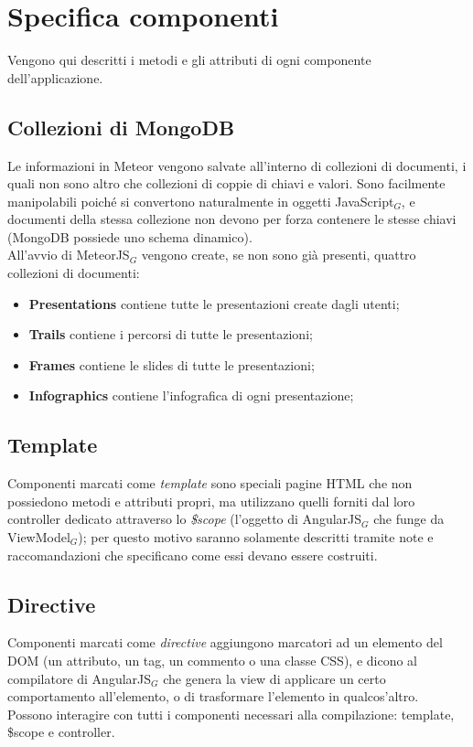 \clearpage
\section{Specifica componenti}
Vengono qui descritti i metodi e gli attributi di ogni componente dell'applicazione. \\
\subsection{Collezioni di MongoDB} \label{collezioni}
Le informazioni in Meteor vengono salvate all'interno di collezioni di documenti, i quali non sono altro che collezioni di coppie di chiavi e valori. Sono facilmente manipolabili poiché si convertono naturalmente in oggetti JavaScript$_G$, e documenti della stessa collezione non devono per forza contenere le stesse chiavi (MongoDB possiede uno schema dinamico). \\
All'avvio di MeteorJS$_G$ vengono create, se non sono già presenti, quattro collezioni di documenti:
\begin{itemize}
\item \textbf{Presentations} contiene tutte le presentazioni create dagli utenti;
\item \textbf{Trails} contiene i percorsi di tutte le presentazioni;
\item \textbf{Frames} contiene le slides di tutte le presentazioni;
\item \textbf{Infographics} contiene l'infografica di ogni presentazione;
\end{itemize}

\subsection{Template}
Componenti marcati come \textit{template} sono speciali pagine HTML che non possiedono metodi e attributi propri, ma utilizzano quelli forniti dal loro controller dedicato attraverso lo \textit{\$scope} (l'oggetto di AngularJS$_G$ che funge da ViewModel$_G$); per questo motivo saranno solamente descritti tramite note e raccomandazioni che specificano come essi devano essere costruiti.

\subsection{Directive}
Componenti marcati come \textit{directive} aggiungono marcatori ad un elemento del DOM (un attributo, un tag, un commento o una classe CSS), e dicono al compilatore di AngularJS$_G$ che genera la view di applicare un certo comportamento all'elemento, o di trasformare l'elemento in qualcos'altro. \\ Possono interagire con tutti i componenti necessari alla compilazione: template, \$scope e controller.

